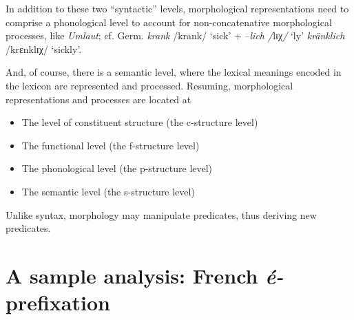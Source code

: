 \documentclass[output=paper]{langsci/langscibook}
\begin{document}
In addition to these two \enquote{syntactic} levels, morphological representations need to comprise a phonological level to account for non-concatenative morphological processes, like  \emph{Umlaut}; cf.
Germ. \emph{krank} /krank/ `sick' + --\emph{lich /}lɪχ\emph{/} `ly' \textrightarrow{}
\emph{kränklich} /krɛnklɪχ/ `sickly'.

And, of course, there is a semantic level, where the lexical meanings encoded in the lexicon are represented and processed. Resuming,
morphological representations and processes are located at

\begin{itemize}
\item The level of constituent structure (the c-structure level)

\item The functional level (the f-structure level)

\item The phonological level (the p-structure level)

\item The semantic level (the s-structure level)

\end{itemize}

Unlike syntax, morphology may manipulate predicates, thus deriving new predicates.

\section{\texorpdfstring{A sample analysis: French
\emph{é-}prefixation}{A sample analysis: French é-prefixation}}\label{a-sample-analysis-french-uxe9-prefixation}

\end{document}
